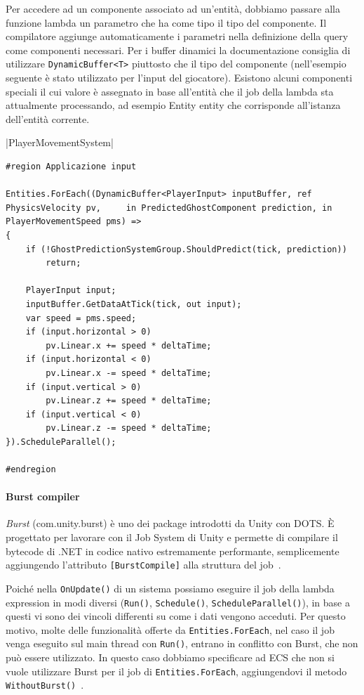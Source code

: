 Per accedere ad un componente associato ad un'entità, dobbiamo passare alla funzione lambda un parametro che ha come tipo il tipo del componente. Il compilatore aggiunge automaticamente i parametri nella definizione della query come componenti necessari.
Per i buffer dinamici la documentazione consiglia di utilizzare \verb|DynamicBuffer<T>| piuttosto che il tipo del componente (nell'esempio seguente è stato utilizzato per l'input del giocatore).
Esistono alcuni componenti speciali il cui valore è assegnato in base all'entità che il job della lambda sta attualmente processando, ad esempio Entity entity che corrisponde all'istanza dell'entità corrente.

|PlayerMovementSystem|

\begin{lstlisting}[caption={Prototipo: lambda expression di \UseVerb{PlayerMovementSystemTerm}, il quale aggiorna la velocità di un Player in base all'input.},label={lst:system-complex-example},language={[Sharp]C}]
#region Applicazione input

Entities.ForEach((DynamicBuffer<PlayerInput> inputBuffer, ref PhysicsVelocity pv,     in PredictedGhostComponent prediction, in PlayerMovementSpeed pms) =>
{
    if (!GhostPredictionSystemGroup.ShouldPredict(tick, prediction))
        return;
    
    PlayerInput input;
    inputBuffer.GetDataAtTick(tick, out input);
    var speed = pms.speed;
    if (input.horizontal > 0) 
        pv.Linear.x += speed * deltaTime;
    if (input.horizontal < 0) 
        pv.Linear.x -= speed * deltaTime;
    if (input.vertical > 0) 
        pv.Linear.z += speed * deltaTime;
    if (input.vertical < 0) 
        pv.Linear.z -= speed * deltaTime;
}).ScheduleParallel();

#endregion
\end{lstlisting}

\paragraph{Burst compiler}
\emph{Burst} (com.unity.burst) è uno dei package introdotti da Unity con DOTS. È progettato per lavorare con il Job System di Unity e permette di compilare il bytecode di .NET in codice nativo estremamente performante, semplicemente aggiungendo l'attributo \verb|[BurstCompile]| alla struttura del job~\cite{doc:unity-burst}.

Poiché nella \verb|OnUpdate()| di un sistema possiamo eseguire il job della lambda expression in modi diversi (\verb|Run()|, \verb|Schedule()|, \verb|ScheduleParallel()|), in base a questi vi sono dei vincoli differenti su come i dati vengono acceduti. Per questo motivo, molte delle funzionalità offerte da \verb|Entities.ForEach|, nel caso il job venga eseguito sul main thread con \verb|Run()|, entrano in conflitto con Burst, che non può essere utilizzato. In questo caso dobbiamo specificare ad ECS che non si vuole utilizzare Burst per il job di \verb|Entities.ForEach|, aggiungendovi il metodo \verb|WithoutBurst()|~\cite{doc:unity-entities-manual}.


